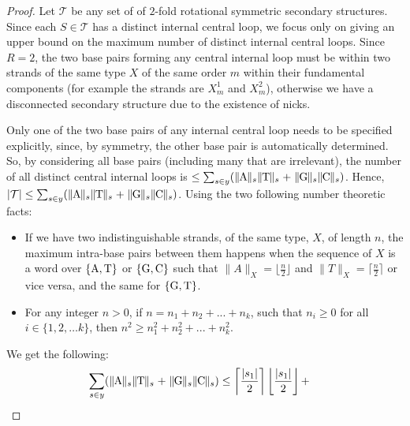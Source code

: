 \documentclass[11pt,letterpaper]{article}  \usepackage[margin=1in]{geometry}
\theoremstyle{definition}  \newtheorem{Definition}[theorem]{Definition}
\begin{document}
\begin{proof}
	Let  $\mathcal{T}$ be any set of of $2$-fold rotational symmetric secondary structures.  
	Since each $S \in \mathcal{T}$ has a distinct internal central loop, we  focus only on giving an upper bound on the maximum number of distinct internal central loops. Since $R=2$, the two base pairs forming any  central internal loop must be within two strands of the same type $X$  of the same order $m$ within their fundamental components (for example the strands are $X_m^1$ and $X_m^2$), otherwise we  have a disconnected secondary structure due to the existence of nicks. 
	
	Only one of the two base pairs of any internal central loop needs to be specified explicitly, since, by symmetry, the other base pair is   automatically determined. 
	So, by considering all base pairs (including many that are irrelevant), the number of all distinct central internal loops is  $\leq \sum_{s\in y} (\parallel\! \! \baseA \!\! \parallel_s \parallel\! \! \baseT \!\! \parallel_s+ \parallel\! \! \baseG \!\! \parallel_s\parallel\! \! \baseC \!\! \parallel_s)$. 
	Hence, $ |\mathcal{T}| \leq \sum_{s\in y} (\parallel\! \! \baseA \!\! \parallel_s \parallel\! \! \baseT \!\! \parallel_s+ \parallel\! \! \baseG \!\! \parallel_s\parallel\! \! \baseC \!\! \parallel_s)$.
	Using the two following number theoretic facts:      
	\begin{itemize} \item
		If we have two indistinguishable strands, of the same type, $X$, of length $n$, the maximum intra-base pairs between them happens when the sequence of $X$ is a word over $\{\mathrm{A},\mathrm{T}\}$ or $\{\mathrm{G},\mathrm{C}\}$ such that $\parallel\! \! A \!\! \parallel_X = \lfloor \frac{n}{2}\rfloor$ and $\parallel\! \! T \!\! \parallel_X = \lceil \frac{n}{2}\rceil$ or vice versa, and the same for $\{\mathrm{G},\mathrm{T}\}$.    
	\end{itemize}
	\begin{itemize} \item
		For any integer $n>0$, if $n = n_1 + n_2+ ... + n_k$, such that $n_i\geq 0$ for all $i \in \{1,2, \ldots k\}$, then $n^2 \geq n_1^2 + n_2^2+ ... + n_k^2$.
	\end{itemize}
	We get the following: 
	\begin{align*}
		\sum_{s\in y} (\parallel\! \! \baseA \!\! \parallel_s \parallel\! \! \baseT \!\! \parallel_s+ \parallel\! \! \baseG \!\! \parallel_s\parallel\! \! \baseC \!\! \parallel_s) & \leq  
		\left\lceil\dfrac{|s_1|}{2}\right\rceil
		\left\lfloor\dfrac{|s_1|}{2}\right\rfloor + 

\end{align*}
\end{proof}
\end{document}
